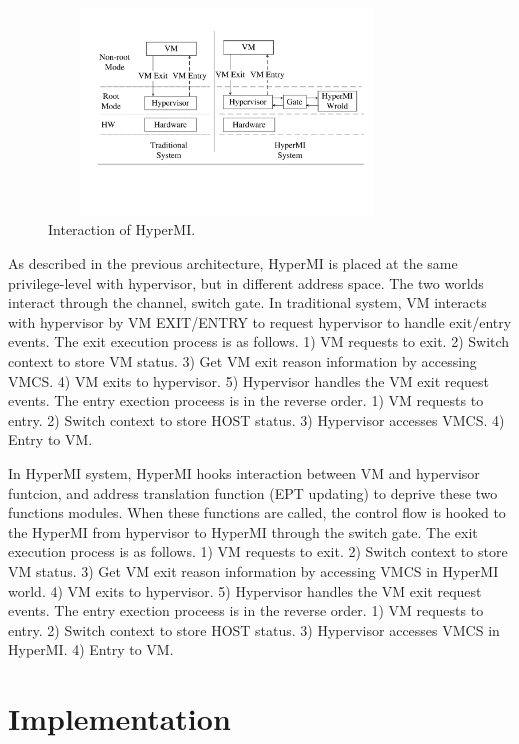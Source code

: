 \documentclass[conference]{IEEEtran}
\begin{document}
\begin{figure}
\centerline{\includegraphics[width=9.5cm, height=5.5cm]{pdfvmcsProcess.pdf}}
\caption{Interaction of HyperMI. } \label{fig+1}
\end{figure}




As described in the previous architecture, HyperMI is placed at the same privilege-level with hypervisor, but in different address space. The two worlds interact through the channel, switch gate.
In traditional system, VM interacts with hypervisor  by VM EXIT/ENTRY to request hypervisor to handle exit/entry events. The exit execution process is as follows. 1) VM requests to exit. 2) Switch context to store VM status. 3) Get VM exit reason information by accessing VMCS. 4) VM exits to hypervisor. 5) Hypervisor handles the VM exit request events. 
The entry exection proceess is in the reverse order. 1) VM requests to entry. 2) Switch context to store HOST status. 3) Hypervisor accesses VMCS. 4) Entry to VM.

In HyperMI system, HyperMI hooks interaction between VM and hypervisor funtcion, and address translation function (EPT updating) to deprive these two functions modules.
When these functions are called, the control flow is hooked to the HyperMI from hypervisor to HyperMI through the switch gate.
The exit execution process is as follows. 1) VM requests to exit. 2) Switch context to store VM status. 3) Get VM exit reason information by accessing VMCS in HyperMI world. 4) VM exits to hypervisor. 5) Hypervisor handles the VM exit request events. 
The entry exection proceess is in the reverse order. 1) VM requests to entry. 2) Switch context to store HOST status. 3) Hypervisor accesses VMCS in HyperMI. 4) Entry to VM.





\section{Implementation}
\end{document}
